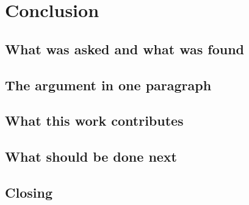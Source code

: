 \section{Conclusion}
\label{sec:conclusion}

\subsection{What was asked and what was found}

\subsection{The argument in one paragraph}

\subsection{What this work contributes}

\subsection{What should be done next}

\subsection{Closing}

